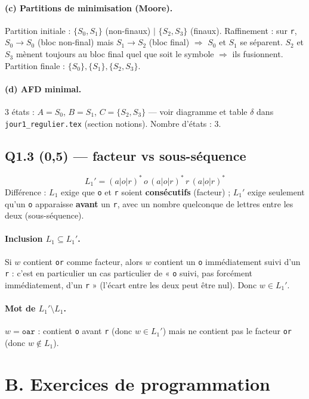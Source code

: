 \documentclass[11pt,a4paper]{scrartcl}
\begin{document}
\paragraph{(c) Partitions de minimisation (Moore).}
Partition initiale : $\{S_0,S_1\}$ (non-finaux) $\mid$ $\{S_2,S_3\}$ (finaux).
Raffinement : sur \texttt r, $S_0\to S_0$ (bloc non-final) mais $S_1\to S_2$ (bloc
final) $\Rightarrow$ $S_0$ et $S_1$ se séparent. $S_2$ et $S_3$ mènent toujours au bloc
final quel que soit le symbole $\Rightarrow$ ils fusionnent. Partition finale :
$\{S_0\},\{S_1\},\{S_2,S_3\}$.

\paragraph{(d) AFD minimal.} 3 états : $A=S_0$, $B=S_1$, $C=\{S_2,S_3\}$ — voir
diagramme et table $\delta$ dans \texttt{jour1\_regulier.tex} (section notions). Nombre
d'états : $\boxed{3}$.

\subsection*{Q1.3 (0,5) — facteur vs sous-séquence}
$$L_1' = (a|o|r)^*\, o\, (a|o|r)^*\, r\, (a|o|r)^*$$
\noindent Différence : $L_1$ exige que \texttt{o} et \texttt{r} soient
\textbf{consécutifs} (facteur) ; $L_1'$ exige seulement qu'un \texttt{o} apparaisse
\textbf{avant} un \texttt{r}, avec un nombre quelconque de lettres entre les deux
(sous-séquence).

\paragraph{Inclusion $L_1\subseteq L_1'$.} Si $w$ contient \texttt{or} comme facteur,
alors $w$ contient un \texttt{o} immédiatement suivi d'un \texttt{r} : c'est en
particulier un cas particulier de « \texttt{o} suivi, pas forcément immédiatement,
d'un \texttt{r} » (l'écart entre les deux peut être nul). Donc $w\in L_1'$.

\paragraph{Mot de $L_1'\setminus L_1$.} $w=\texttt{oar}$ : contient \texttt{o} avant
\texttt{r} (donc $w\in L_1'$) mais ne contient pas le facteur \texttt{or} (donc
$w\notin L_1$).

\section*{B. Exercices de programmation}
\end{document}
